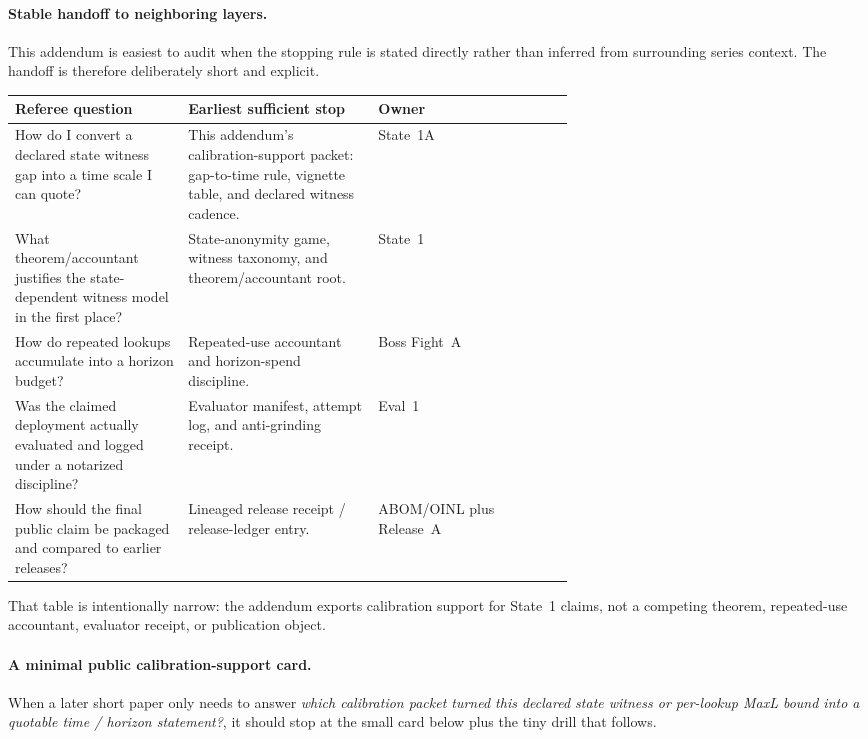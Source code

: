\documentclass[11pt]{article}
\theoremstyle{definition}
\theoremstyle{remark}
\begin{document}
\paragraph{Stable handoff to neighboring layers.}
This addendum is easiest to audit when the stopping rule is stated directly rather than inferred from surrounding series context.
The handoff is therefore deliberately short and explicit.

\begin{center}
\begin{tabularx}{0.97\linewidth}{@{}>{\raggedright\arraybackslash}p{0.31\linewidth}>{\raggedright\arraybackslash}p{0.34\linewidth}>{\raggedright\arraybackslash}X@{}}
\toprule
\textbf{Referee question} & \textbf{Earliest sufficient stop} & \textbf{Owner} \\
\midrule
How do I convert a declared state witness gap into a time scale I can quote? & This addendum's calibration-support packet: gap-to-time rule, vignette table, and declared witness cadence. & State~1A \\
What theorem/accountant justifies the state-dependent witness model in the first place? & State-anonymity game, witness taxonomy, and theorem/accountant root. & State~1 \\
How do repeated lookups accumulate into a horizon budget? & Repeated-use accountant and horizon-spend discipline. & Boss Fight~A \\
Was the claimed deployment actually evaluated and logged under a notarized discipline? & Evaluator manifest, attempt log, and anti-grinding receipt. & Eval~1 \\
How should the final public claim be packaged and compared to earlier releases? & Lineaged release receipt / release-ledger entry. & ABOM/OINL plus Release~A \\
\bottomrule
\end{tabularx}
\end{center}


That table is intentionally narrow: the addendum exports calibration support for State~1 claims, not a competing theorem, repeated-use accountant, evaluator receipt, or publication object.

\paragraph{A minimal public calibration-support card.}
When a later short paper only needs to answer \emph{which calibration packet turned this declared state witness or per-lookup MaxL bound into a quotable time / horizon statement?}, it should stop at the small card below plus the tiny drill that follows.
\end{document}
